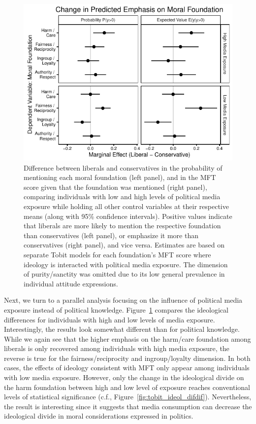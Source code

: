 \documentclass[12pt]{article}
\begin{document}
\begin{figure}[ht]\centering
\includegraphics{../calc/fig/tobit_ideol_media.pdf}
\caption{Difference between liberals and conservatives in the probability of mentioning each moral foundation (left panel), and in the MFT score given that the foundation was mentioned (right panel), comparing individuals with low and high levels of political media exposure while holding all other control variables at their respective means (along with 95\% confidence intervals). Positive values indicate that liberals are more likely to mention the respective foundation than conservatives (left panel), or emphasize it more than conservatives (right panel), and vice versa. Estimates are based on separate Tobit models for each foundation's MFT score where ideology is interacted with political media exposure. The dimension of purity/sanctity was omitted due to its low general prevalence in individual attitude expressions.}\label{fig:tobit_ideol_media}
\end{figure}

Next, we turn to a parallel analysis focusing on the influence of political media exposure instead of political knowledge. Figure~\ref{fig:tobit_ideol_media} compares the ideological differences for individuals with high and low levels of media exposure. Interestingly, the results look somewhat different than for political knowledge. While we again see that the higher emphasis on the harm/care foundation among liberals is only recovered among individuals with high media exposure, the reverse is true for the fairness/reciprocity and ingroup/loyalty dimension. In both cases, the effects of ideology consistent with MFT only appear among individuals with low media exposure. However, only the change in the ideological divide on the harm foundation between high and low level of exposure reaches conventional levels of statistical significance (c.f., Figure~\ref{fig:tobit_ideol_difdif}). Nevertheless, the result is interesting since it suggests that media consumption can decrease the ideological divide in moral considerations expressed in politics.
\end{document}
